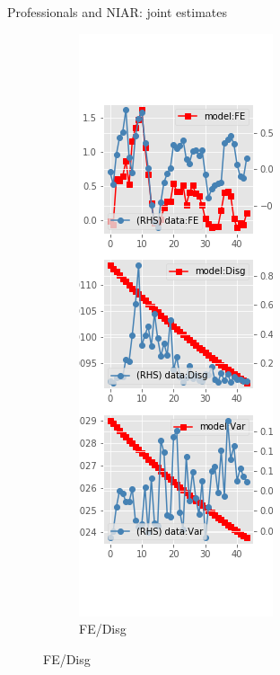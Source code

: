 \documentclass{beamer}
\begin{document}
\begin{frame}{Professionals and NIAR: joint estimates}
\begin{figure}[ht]
\begin{subfigure}[b]{0.2\textwidth}
		\end{subfigure}
		\hfill
		\begin{subfigure}[b]{0.2\textwidth}
			\caption{FE/Disg}
			\includegraphics[width=\textwidth, height = 0.8\textheight]{figuresDraft/spf_ni_est_joint_diag2.png}

\end{subfigure}
\end{figure}
\end{frame}
\end{document}
